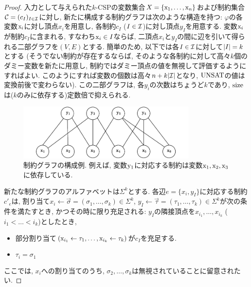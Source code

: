 \begin{proof}
  入力として与えられた$k$-CSPの変数集合$X=\qty{\mathrm{x}_1,\dots,\mathrm{x}_n}$および制約集合$\mathcal{C}=(c_I)_{I\in\mathcal{I}}$に対し,
  新たに構成する制約グラフは次のような構造を持つ:
  $\varphi$の各変数$\mathrm{x}_i$に対し頂点$x_i$を用意し, 各制約$c_I$ ($I\in\mathcal{I}$)に対し頂点$y_I$を用意する.
  変数$\mathrm{x}_i$が制約$c_I$に含まれる, すなわち$\mathrm{x}_i\in I$ならば, 二頂点$x_i$と$y_I$の間に辺を引いて得られる二部グラフを$(V,E)$とする.
  簡単のため, 以下では各$I\in\mathcal{I}$に対して$\abs{I}=k$とする (そうでない制約が存在するならば, そのような各制約に対して高々$k$個のダミー変数を新たに用意し, 制約ではダミー頂点の値を無視して評価するようにすればよい. このようにすれば変数の個数は高々$n+k\abs{\mathcal{I}}$となり, $\mathrm{UNSAT}$の値は変換前後で変わらない).
  この二部グラフは, 各$y_i$の次数はちょうど$k$であり, $\mathrm{size}$は($k$のみに依存する)定数倍で抑えられる.

  \begin{figure}[ht]
    \centering
    \includegraphics[width=0.8\textwidth]{images/k-to-two.pdf}
    \caption{制約グラフの構成例. 例えば, 変数$\mathrm{y}_1$に対応する制約は変数$\mathrm{x}_1,\mathrm{x}_2,\mathrm{x}_3$に依存している. \label{fig:k-to-two}}
  \end{figure}

  新たな制約グラフのアルファベットは$\Sigma^k$とする.
  各辺$e=\{x_i,y_I\}$に対応する制約$c'_e$は, 割り当て$x_i\leftarrow \vec{\sigma}=(\sigma_1,\dots,\sigma_k)\in\Sigma^k$, $y_I\leftarrow \vec{\tau}=(\tau_1,\dots,\tau_k)\in\Sigma^k$が次の条件を満たすとき, かつその時に限り充足される: $y_I$の隣接頂点を$x_{i_1},\dots,x_{i_k}$ ($i_1<\dots<i_k$)としたとき,
  \begin{itemize}
    \item 部分割り当て$(\mathrm{x}_{i_1}\leftarrow \tau_1,\dots,\mathrm{x}_{i_k}\leftarrow \tau_k)$が$c_I$を充足する.
    \item $\tau_i = \sigma_1$
  \end{itemize}
  ここでは, $x_i$への割り当てのうち, $\sigma_2,\dots,\sigma_k$は無視されていることに留意されたい.


\end{proof}
